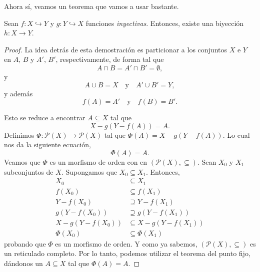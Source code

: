 Ahora sí, veamos un teorema que vamos a usar bastante.

\begin{theorem}
	Sean $f: X \hookrightarrow Y$ y $g: Y \hookrightarrow X$ funciones \textit{inyectivas}. Entonces, existe una biyección $h: X \to  Y$.
\end{theorem}

\begin{proof}
	La idea detrás de esta demostración es particionar a los conjuntos $X$ e $Y$ en $A$, $B$ y $A'$, $B'$, respectivamente, de forma tal que
	\begin{equation*}
		A \cap B = A' \cap B' = \emptyset,
	\end{equation*}
	y
	\begin{equation*}
		A \cup B = X \quad \text{y} \quad A' \cup B' = Y,
	\end{equation*}
	y además
	\begin{equation*}
		f(A) = A' \quad \text{y} \quad f(B) = B'.
	\end{equation*}
	\begin{center}
		
	\end{center}

	Esto se reduce a encontrar $A \subseteq X$ tal que
	\begin{equation*}
		X - g(Y - f(A)) = A.
	\end{equation*}
	Definimos $\Phi : \mathcal{P}(X) \to  \mathcal{P}(X)$ tal que $\Phi(A) = X - g(Y - f(A))$. Lo cual nos da la siguiente ecuación,
	\begin{equation*}
		\Phi (A) = A.
	\end{equation*}
	Veamos que $\Phi$ es un morfismo de orden con en $(\mathcal{P}(X), \subseteq )$. Sean $X_{0}$ y $X_{1}$ subconjuntos de $X$. Supongamos que $X_{0} \subseteq X_{1}$. Entonces,
	\begin{align*}
		X_{0}               & \subseteq X_{1}               \\
		f(X_{0})            & \subseteq f(X_{1})            \\
		Y - f(X_{0})        & \supseteq Y - f(X_{1})        \\
		g(Y - f(X_{0}))     & \supseteq g(Y - f(X_{1}))     \\
		X - g(Y - f(X_{0})) & \subseteq X - g(Y - f(X_{1})) \\
		\Phi(X_{0})         & \subseteq \Phi(X_{1})
	\end{align*}
	probando que $\Phi$ es un morfismo de orden. Y como ya sabemos, $(\mathcal{P}(X), \subseteq)$ es un reticulado completo. Por lo tanto, podemos utilizar el teorema del punto fijo, dándonos un $A \subseteq X$ tal que $\Phi (A) = A$.
\end{proof}

